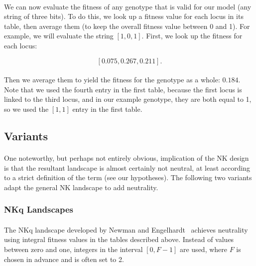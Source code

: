 \documentclass[12pt,letterpaper,titlepage]{article}
\begin{document}
\paragraph{}
We can now evaluate the fitness of any genotype that is valid for our model
(any string of three bits). To do this, we look up a fitness value for each
locus in its table, then average them (to keep the overall fitness value
between 0 and 1). For example, we will evaluate the string
$\left[1,0,1\right]$. First, we look up the fitness for each locus:

\begin{displaymath}
    \left[0.075, 0.267, 0.211\right].
\end{displaymath}

\paragraph{}
Then we average them to yield the fitness for the genotype as a whole: $0.184$.
Note that we used the fourth entry in the first table, because the first locus
is linked to the third locus, and in our example genotype, they are both equal
to 1, so we used the $\left[1, 1\right]$ entry in the first table.

\subsection{Variants}

\paragraph{}
One noteworthy, but perhaps not entirely obvious, implication of the NK design
is that the resultant landscape is almost certainly not neutral, at least
according to a strict definition of the term (see our hypotheses). The
following two variants adapt the general NK landscape to add neutrality.

\subsubsection{NKq Landscapes}

\paragraph{}
The NKq landscape developed by Newman and Engelhardt~\cite{Newman1998} achieves
neutrality using integral fitness values in the tables described above. Instead
of values between zero and one, integers in the interval $\left[0,F-1\right]$
are used, where $F$ is chosen in advance and is often set to 2.
\end{document}
